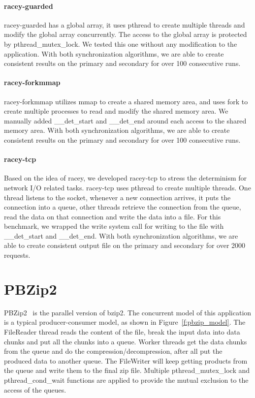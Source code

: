 \paragraph{racey-guarded} racey-guarded has a global array, it uses pthread to create multiple threads and modify the global array concurrently. The access to the global array is protected by pthread\_mutex\_lock. We tested this one without any modification to the application. With both synchronization algorithms, we are able to create consistent results on the primary and secondary for over 100 consecutive runs.

\paragraph{racey-forkmmap} racey-forkmmap utilizes mmap to create a shared memory area, and uses fork to create multiple processes to read and modify the shared memory area. We manually added \_\_det\_start and \_\_det\_end around each access to the shared memory area. With both synchronization algorithms, we are able to create consistent results on the primary and secondary for over 100 consecutive runs.

\paragraph{racey-tcp} Based on the idea of racey, we developed racey-tcp to stress the determinism for network I/O related tasks. racey-tcp uses pthread to create multiple threads. One thread listens to the socket, whenever a new connection arrives, it puts the connection into a queue, other threads retrieve the connection from the queue, read the data on that connection and write the data into a file. For this benchmark, we wrapped the write system call for writing to the file with \_\_det\_start and \_\_det\_end. With both synchronization algorithms, we are able to create consistent output file on the primary and secondary for over 2000 requests.

\section{PBZip2}
PBZip2~\cite{gilchristparallel} is the parallel version of bzip2. The concurrent model of this application is a typical producer-consumer model, as shown in Figure~\ref{f:pbzip_model}. The FileReader thread reads the content of the file, break the input data into data chunks and put all the chunks into a queue. Worker threads get the data chunks from the queue and do the compression/decompression, after all put the produced data to another queue. The FileWriter will keep getting products from the queue and write them to the final zip file. Multiple pthread\_mutex\_lock and pthread\_cond\_wait functions are applied to provide the mutual exclusion to the access of the queues.

